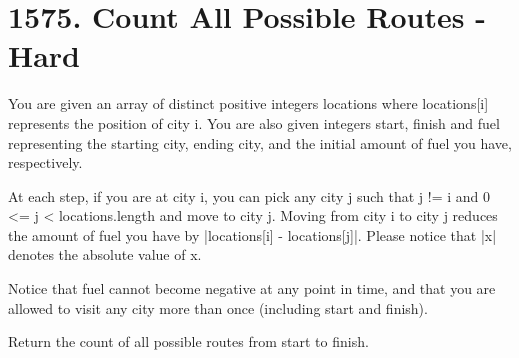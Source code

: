 \documentclass[9pt, b5paaper]{book}
\begin{document}
\section{1575. Count All Possible Routes - Hard}
\label{sec-1-12}
You are given an array of distinct positive integers locations where locations[i] represents the position of city i. You are also given integers start, finish and fuel representing the starting city, ending city, and the initial amount of fuel you have, respectively.

At each step, if you are at city i, you can pick any city j such that j != i and 0 <= j < locations.length and move to city j. Moving from city i to city j reduces the amount of fuel you have by |locations[i] - locations[j]|. Please notice that |x| denotes the absolute value of x.

Notice that fuel cannot become negative at any point in time, and that you are allowed to visit any city more than once (including start and finish).

Return the count of all possible routes from start to finish.
\end{document}
